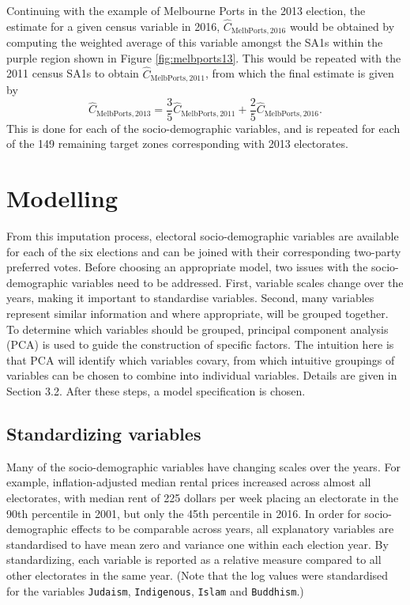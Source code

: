 \documentclass[
  times, doublespace]{anzsauth}
\begin{document}
Continuing with the example of Melbourne Ports in the 2013 election, the estimate for a given census variable in 2016, \(\hat{C}_{\text{MelbPorts}, 2016}\) would be obtained by computing the weighted average of this variable amongst the SA1s within the purple region shown in Figure \ref{fig:melbports13}. This would be repeated with the 2011 census SA1s to obtain \(\hat{C}_{\text{MelbPorts}, 2011}\), from which the final estimate is given by
\[
  \hat{C}_{\text{MelbPorts},2013}
    = \frac{3}{5} \hat{C}_{\text{MelbPorts},2011} + \frac{2}{5} \hat{C}_{\text{MelbPorts},2016}.
\]
This is done for each of the socio-demographic variables, and is repeated for each of the 149 remaining target zones corresponding with 2013 electorates.

\hypertarget{modelling}{%
\section{Modelling}\label{modelling}}

From this imputation process, electoral socio-demographic variables are available for each of the six elections and can be joined with their corresponding two-party preferred votes. Before choosing an appropriate model, two issues with the socio-demographic variables need to be addressed. First, variable scales change over the years, making it important to standardise variables. Second, many variables represent similar information and where appropriate, will be grouped together. To determine which variables should be grouped, principal component analysis (PCA) is used to guide the construction of specific factors. The intuition here is that PCA will identify which variables covary, from which intuitive groupings of variables can be chosen to combine into individual variables. Details are given in Section 3.2. After these steps, a model specification is chosen.

\hypertarget{standardizing-variables}{%
\subsection{Standardizing variables}\label{standardizing-variables}}

Many of the socio-demographic variables have changing scales over the years. For example, inflation-adjusted median rental prices increased across almost all electorates, with median rent of 225 dollars per week placing an electorate in the 90th percentile in 2001, but only the 45th percentile in 2016. In order for socio-demographic effects to be comparable across years, all explanatory variables are standardised to have mean zero and variance one within each election year. By standardizing, each variable is reported as a relative measure compared to all other electorates in the same year. (Note that the log values were standardised for the variables \texttt{Judaism}, \texttt{Indigenous}, \texttt{Islam} and \texttt{Buddhism}.)
\end{document}
